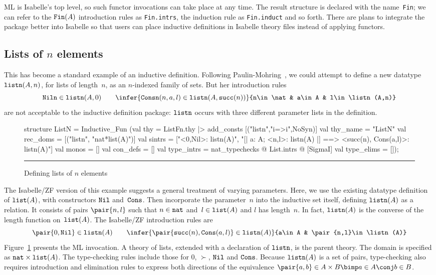 ML is Isabelle's top level, so such functor invocations can take place at
any time.  The result structure is declared with the name~{\tt Fin}; we can
refer to the $\hbox{\tt Fin}(A)$ introduction rules as {\tt Fin.intrs}, the induction
rule as {\tt Fin.induct} and so forth.  There are plans to integrate the
package better into Isabelle so that users can place inductive definitions
in Isabelle theory files instead of applying functors.


\subsection{Lists of $n$ elements}\label{listn-sec}
This has become a standard example of an inductive definition.  Following
Paulin-Mohring~\cite{paulin92}, we could attempt to define a new datatype
$\hbox{\tt listn}(A,n)$, for lists of length~$n$, as an $n$-indexed family of sets.
But her introduction rules
\[ \hbox{\tt Niln}\in\listn(A,0)  \qquad
   \infer{\hbox{\tt Consn}(n,a,l)\in\listn(A,\succ(n))}
         {n\in\nat & a\in A & l\in\listn(A,n)}
\]
are not acceptable to the inductive definition package:
$\hbox{\tt listn}$ occurs with three different parameter lists in the definition.

\begin{figure}
\begin{ttbox}
structure ListN = Inductive_Fun
 (val thy        = ListFn.thy |> add_consts [("listn","i=>i",NoSyn)]
  val thy_name   = "ListN"
  val rec_doms   = [("listn", "nat*list(A)")]
  val sintrs     = 
        ["<0,Nil>: listn(A)",
         "[| a: A;  <n,l>: listn(A) |] ==> <succ(n), Cons(a,l)>: listn(A)"]
  val monos      = []
  val con_defs   = []
  val type_intrs = nat_typechecks @ List.intrs @ [SigmaI]
  val type_elims = []);
\end{ttbox}
\hrule
\caption{Defining lists of $n$ elements} \label{listn-fig}
\end{figure} 

The Isabelle/ZF version of this example suggests a general treatment of
varying parameters.  Here, we use the existing datatype definition of
$\hbox{\tt list}(A)$, with constructors $\hbox{\tt Nil}$ and~$\hbox{\tt Cons}$.  Then incorporate the
parameter~$n$ into the inductive set itself, defining $\hbox{\tt listn}(A)$ as a
relation.  It consists of pairs $\pair{n,l}$ such that $n\in\hbox{\tt nat}$
and~$l\in\hbox{\tt list}(A)$ and $l$ has length~$n$.  In fact, $\hbox{\tt listn}(A)$ is the
converse of the length function on~$\hbox{\tt list}(A)$.  The Isabelle/ZF introduction
rules are
\[ \pair{0,\Nil}\in\listn(A)  \qquad
   \infer{\pair{\succ(n),\Cons(a,l)}\in\listn(A)}
         {a\in A & \pair{n,l}\in\listn(A)}
\]
Figure~\ref{listn-fig} presents the ML invocation.  A theory of lists,
extended with a declaration of $\hbox{\tt listn}$, is the parent theory.  The domain
is specified as $\hbox{\tt nat}\times\hbox{\tt list}(A)$.  The type-checking rules include those
for 0, $\succ$, $\hbox{\tt Nil}$ and $\hbox{\tt Cons}$.  Because $\hbox{\tt listn}(A)$ is a set of pairs,
type-checking also requires introduction and elimination rules to express
both directions of the equivalence $\pair{a,b}\in A\times B \bimp a\in A
\conj b\in B$. 

